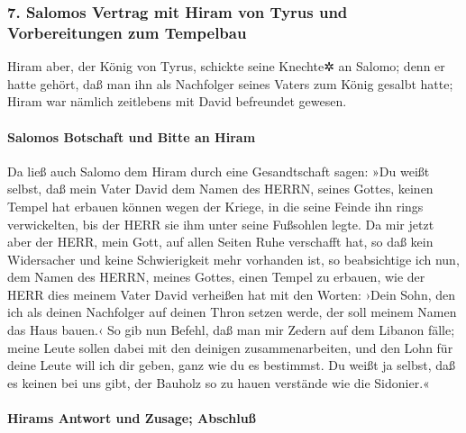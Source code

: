 \hypertarget{salomos-vertrag-mit-hiram-von-tyrus-und-vorbereitungen-zum-tempelbau}{%
\subsubsection{7. Salomos Vertrag mit Hiram von Tyrus und Vorbereitungen
zum
Tempelbau}\label{salomos-vertrag-mit-hiram-von-tyrus-und-vorbereitungen-zum-tempelbau}}

Hiram aber, der König von Tyrus, schickte seine Knechte✲
an Salomo; denn er hatte gehört, daß man ihn als Nachfolger seines
Vaters zum König gesalbt hatte; Hiram war nämlich zeitlebens mit David
befreundet gewesen.

\hypertarget{salomos-botschaft-und-bitte-an-hiram}{%
\paragraph{Salomos Botschaft und Bitte an
Hiram}\label{salomos-botschaft-und-bitte-an-hiram}}

Da ließ auch Salomo dem Hiram durch eine Gesandtschaft
sagen: »Du weißt selbst, daß mein Vater David dem Namen
des HERRN, seines Gottes, keinen Tempel hat erbauen können wegen der
Kriege, in die seine Feinde ihn rings verwickelten, bis der HERR sie ihm
unter seine Fußsohlen legte. Da mir jetzt aber der HERR,
mein Gott, auf allen Seiten Ruhe verschafft hat, so daß kein Widersacher
und keine Schwierigkeit mehr vorhanden ist, so
beabsichtige ich nun, dem Namen des HERRN, meines Gottes, einen Tempel
zu erbauen, wie der HERR dies meinem Vater David verheißen hat mit den
Worten: ›Dein Sohn, den ich als deinen Nachfolger auf deinen Thron
setzen werde, der soll meinem Namen das Haus bauen.‹ So
gib nun Befehl, daß man mir Zedern auf dem Libanon fälle; meine Leute
sollen dabei mit den deinigen zusammenarbeiten, und den Lohn für deine
Leute will ich dir geben, ganz wie du es bestimmst. Du weißt ja selbst,
daß es keinen bei uns gibt, der Bauholz so zu hauen verstände wie die
Sidonier.«

\hypertarget{hirams-antwort-und-zusage-abschluuxdf}{%
\paragraph{Hirams Antwort und Zusage;
Abschluß}\label{hirams-antwort-und-zusage-abschluuxdf}}

